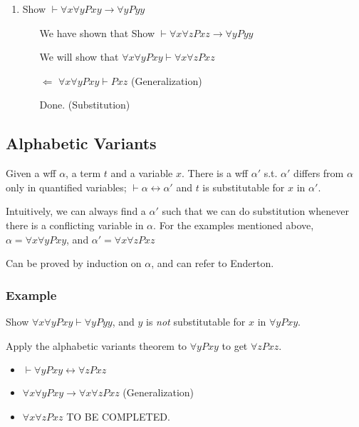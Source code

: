 \begin{enumerate}
    \item Show $\vdash\forall x \forall y Pxy \to \forall{y} Pyy$
    \begin{itemize}
        \item[] We have shown that Show $\vdash\forall x \forall z Pxz \to \forall{y} Pyy$
        \item[] We will show that $\forall x\forall y Pxy \vdash\forall{x}\forall{z}Pxz$
        \item[$\Leftarrow$] $\forall{x}\forall{y}Pxy \vdash Pxz$ (Generalization)
        \item[] Done. (Substitution)
    \end{itemize}
\end{enumerate}

\subsection{Alphabetic Variants}

\begin{theorem}
    \label{thm:AlphabeticVariants}
    Given a wff $\alpha$, a term $t$ and a variable $x$. There is a wff $\alpha'$ s.t. $\alpha'$ differs from $\alpha$ only in quantified variables; $\vdash \alpha\leftrightarrow\alpha'$ and $t$ is substitutable for $x$ in $\alpha'$.
\end{theorem}

Intuitively, we can always find a $\alpha'$ such that we can do substitution whenever there is a conflicting variable in $\alpha$. For the examples mentioned above, $\alpha=\forall{x}\forall{y}Pxy$, and $\alpha'=\forall{x}\forall{z}Pxz$

Can be proved by induction on $\alpha$, and can refer to Enderton.

\subsubsection{Example}

Show $\forall{x}\forall{y}Pxy\vdash\forall{y}Pyy$, and $y$ is \emph{not} substitutable for $x$ in $\forall{y}Pxy$.

Apply the alphabetic variants theorem to $\forall{y}Pxy$ to get $\forall{z}Pxz$.

\begin{itemize}
    \item $\vdash\forall{y}Pxy\leftrightarrow\forall{z}Pxz$
    \item $\forall{x}\forall{y}Pxy\to\forall{x}\forall{z}Pxz$ (Generalization)
    \item $\forall{x}\forall{z}Pxz$ TO BE COMPLETED.
\end{itemize}

